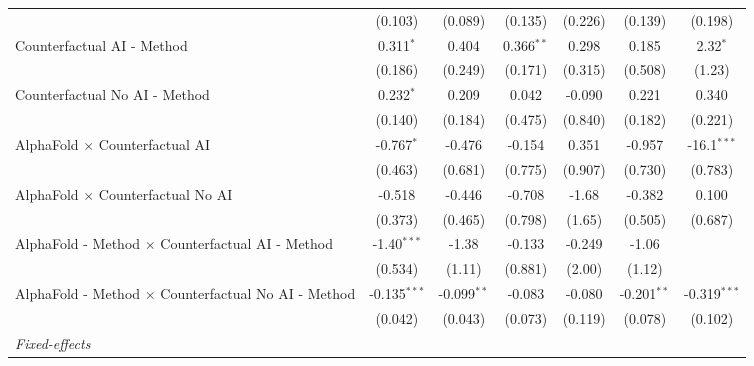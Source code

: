 \begin{tabular}{lcccccc}
                                                              & (0.103)        & (0.089)       & (0.135)      & (0.226)     & (0.139)       & (0.198)\\   
   Counterfactual AI - Method                                 & 0.311$^{*}$    & 0.404         & 0.366$^{**}$ & 0.298       & 0.185         & 2.32$^{*}$\\   
                                                              & (0.186)        & (0.249)       & (0.171)      & (0.315)     & (0.508)       & (1.23)\\   
   Counterfactual No AI - Method                              & 0.232$^{*}$    & 0.209         & 0.042        & -0.090      & 0.221         & 0.340\\   
                                                              & (0.140)        & (0.184)       & (0.475)      & (0.840)     & (0.182)       & (0.221)\\   
   AlphaFold $\times$ Counterfactual AI                       & -0.767$^{*}$   & -0.476        & -0.154       & 0.351       & -0.957        & -16.1$^{***}$\\   
                                                              & (0.463)        & (0.681)       & (0.775)      & (0.907)     & (0.730)       & (0.783)\\   
   AlphaFold $\times$ Counterfactual No AI                    & -0.518         & -0.446        & -0.708       & -1.68       & -0.382        & 0.100\\   
                                                              & (0.373)        & (0.465)       & (0.798)      & (1.65)      & (0.505)       & (0.687)\\   
   AlphaFold - Method $\times$ Counterfactual AI - Method     & -1.40$^{***}$  & -1.38         & -0.133       & -0.249      & -1.06         &   \\   
                                                              & (0.534)        & (1.11)        & (0.881)      & (2.00)      & (1.12)        &   \\   
   AlphaFold - Method $\times$ Counterfactual No AI - Method  & -0.135$^{***}$ & -0.099$^{**}$ & -0.083       & -0.080      & -0.201$^{**}$ & -0.319$^{***}$\\   
                                                              & (0.042)        & (0.043)       & (0.073)      & (0.119)     & (0.078)       & (0.102)\\   
   \midrule
   \emph{Fixed-effects}\\

\end{tabular}
